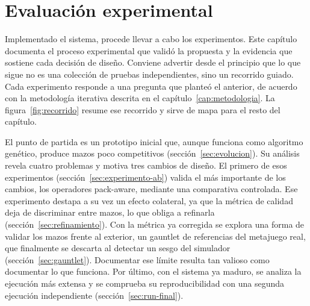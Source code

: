 
\chapter{Evaluación experimental}
\label{cap:desarrollo}

Implementado el sistema, procede llevar a cabo los experimentos. Este capítulo documenta el proceso experimental que validó la propuesta y la evidencia que sostiene cada decisión de diseño. Conviene advertir desde el principio que lo que sigue no es una colección de pruebas independientes, sino un recorrido guiado. Cada experimento responde a una pregunta que planteó el anterior, de acuerdo con la metodología iterativa descrita en el capítulo~\ref{cap:metodologia}. La figura~\ref{fig:recorrido} resume ese recorrido y sirve de mapa para el resto del capítulo.

El punto de partida es un prototipo inicial que, aunque funciona como algoritmo genético, produce mazos poco competitivos (sección~\ref{sec:evolucion}). Su análisis revela cuatro problemas y motiva tres cambios de diseño. El primero de esos experimentos (sección~\ref{sec:experimento-ab}) valida el más importante de los cambios, los operadores pack-aware, mediante una comparativa controlada. Ese experimento destapa a su vez un efecto colateral, ya que la métrica de calidad deja de discriminar entre mazos, lo que obliga a refinarla (sección~\ref{sec:refinamiento}). Con la métrica ya corregida se explora una forma de validar los mazos frente al exterior, un gauntlet de referencias del metajuego real, que finalmente se descarta al detectar un sesgo del simulador (sección~\ref{sec:gauntlet}). Documentar ese límite resulta tan valioso como documentar lo que funciona. Por último, con el sistema ya maduro, se analiza la ejecución más extensa y se comprueba su reproducibilidad con una segunda ejecución independiente (sección~\ref{sec:run-final}).

